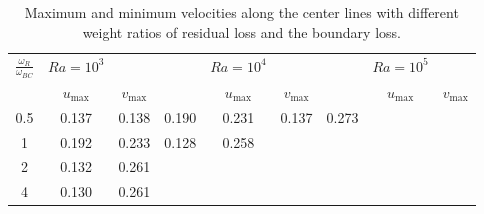 \documentclass{article}
\begin{document}
\begin{table}[H]
\centering
\caption{Maximum and minimum velocities along the center lines with different weight ratios of residual loss and the boundary loss.}
\begin{tabular}{ccccccccc}
\toprule
$\frac{\omega_R}{\omega_{BC}}$ & $Ra = 10^3$ & & & $Ra = 10^4$ & & & $Ra = 10^5$ \\
\cmidrule{2-3} \cmidrule{5-6} \cmidrule{8-9}
& $u_{\text{max}}$ & $v_{\text{max}}$ & & $u_{\text{max}}$ & $v_{\text{max}}$ & & $u_{\text{max}}$ & $v_{\text{max}}$ \\
\midrule
0.5 & 0.137 & 0.138 & 0.190 & 0.231 & 0.137 & 0.273 \\
1 & 0.192 & 0.233 & 0.128 & 0.258 & & \\
2 & 0.132 & 0.261 & & & & \\
4 & 0.130 & 0.261 & & & & \\
\bottomrule
\end{tabular}
\end{table}
\printbibliography
\end{document}
